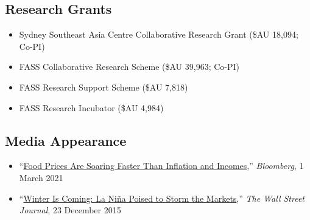 \documentclass[10pt]{article}
\begin{document}
	\subsection*{Research Grants}
	\begin{itemize}
		\item {} Sydney Southeast Asia Centre Collaborative Research Grant (\$AU 18,094; Co-PI)
		\item {} FASS Collaborative Research Scheme (\$AU 39,963; Co-PI)
		\item {} FASS Research Support Scheme (\$AU 7,818)
		\item {} FASS Research Incubator (\$AU 4,984)
	\end{itemize}
	
	\subsection*{Media Appearance}
	\begin{itemize}
		\item ``\href{https://www.bloomberg.com/news/articles/2021-03-01/inflation-2021-malnutrition-and-hunger-fears-rise-as-food-prices-soar-globally}{Food Prices Are Soaring Faster Than Inflation and Incomes},'' \textit{Bloomberg}, 1 March 2021
		\item ``\href{https://www.wsj.com/articles/winter-is-coming-la-nina-poised-to-storm-the-markets-1450850704}{Winter Is Coming: La Niña Poised to Storm the Markets},'' \textit{The Wall Street Journal}, 23 December 2015
	\end{itemize}
	
\end{document}
